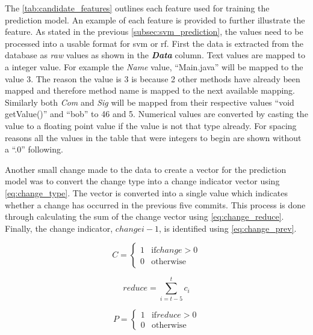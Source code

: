 The \autoref{tab:candidate_features} outlines each feature used for training the prediction model. An example of each feature is provided to further illustrate the feature. As stated in the previous \autoref{subsec:svm_prediction}, the values need to be processed into a usable format for \gls{svm} or \gls{rf}. First the data is extracted from the database as \textit{raw} values as shown in the \textit{\textbf{Data}} column. Text values are mapped to a integer value. For example the \textit{Name} value, ``Main.java'' will be mapped to the value 3. The reason the value is 3 is because 2 other methods have already been mapped and therefore method name is mapped to the next available mapping. Similarly both \textit{Com} and \textit{Sig} will be mapped from their respective values ``void getValue()'' and ``bob'' to 46 and 5. Numerical values are converted by casting the value to a floating point value if the value is not that type already. For spacing reasons all the values in the table that were integers to begin are shown without a ``.0'' following.

Another small change made to the data to create a vector for the prediction model was to convert the change type into a change indicator vector using \autoref{eq:change_type}. The vector is converted into a single value which indicates whether a change has occurred in the previous five commits. This process is done through calculating the sum of the change vector using \autoref{eq:change_reduce}. Finally, the change indicator, $change{i-1}$, is identified using \autoref{eq:change_prev}.

\begin{equation} 
\label{eq:change_type}
C = \left\{\begin{matrix}
1 & \text{if} change > 0 \\
0 & \text{otherwise}
\end{matrix}\right.
\end{equation}

\begin{equation} 
\label{eq:change_reduce}
reduce = \sum_{i=t-5}^{t}{c_i}
\end{equation}

\begin{equation} 
\label{eq:change_prev}
P = \left\{\begin{matrix}
1 & \text{if} reduce > 0 \\
0 & \text{otherwise}
\end{matrix}\right.
\end{equation}

